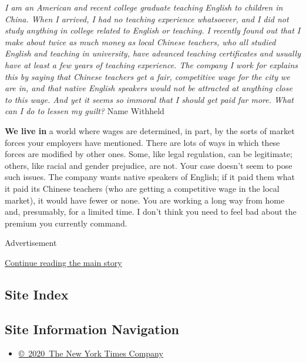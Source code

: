 \emph{I am an American and recent college graduate teaching English to
children in China. When I arrived, I had no teaching experience
whatsoever, and I did not study anything in college related to English
or teaching. I recently found out that I make about twice as much money
as local Chinese teachers, who all studied English and teaching in
university, have advanced teaching certificates and usually have at
least a few years of teaching experience. The company I work for
explains this by saying that Chinese teachers get a fair, competitive
wage for the city we are in, and that native English speakers would not
be attracted at anything close to this wage. And yet it seems so immoral
that I should get paid far more. What can I do to lessen my guilt?} Name
Withheld

\textbf{We live in} a world where wages are determined, in part, by the
sorts of market forces your employers have mentioned. There are lots of
ways in which these forces are modified by other ones. Some, like legal
regulation, can be legitimate; others, like racial and gender prejudice,
are not. Your case doesn't seem to pose such issues. The company wants
native speakers of English; if it paid them what it paid its Chinese
teachers (who are getting a competitive wage in the local market), it
would have fewer or none. You are working a long way from home and,
presumably, for a limited time. I don't think you need to feel bad about
the premium you currently command.

Advertisement

\protect\hyperlink{after-bottom}{Continue reading the main story}

\hypertarget{site-index}{%
\subsection{Site Index}\label{site-index}}

\hypertarget{site-information-navigation}{%
\subsection{Site Information
Navigation}\label{site-information-navigation}}

\begin{itemize}
\tightlist
\item
  \href{https://help.nytimes3xbfgragh.onion/hc/en-us/articles/115014792127-Copyright-notice}{©~2020~The
  New York Times Company}
\end{itemize}

